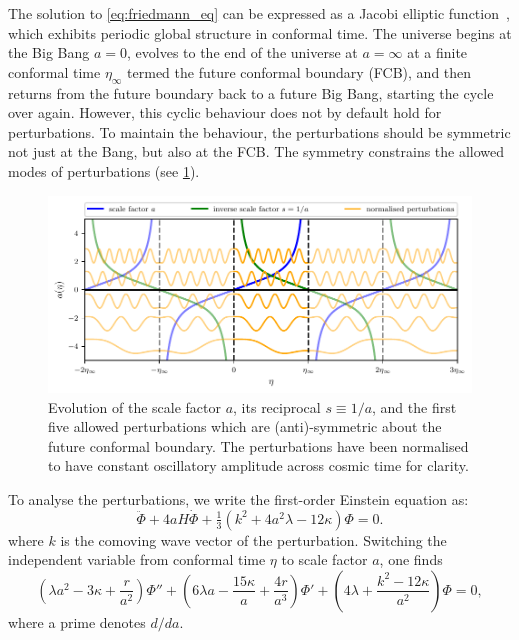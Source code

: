 \documentclass[%
 reprint,
 amsmath,amssymb,
 prl,
]{revtex4-2}
\begin{document}
The solution to \cref{eq:friedmann_eq} can be expressed as a Jacobi elliptic function~\cite{2021arXiv210906204B}, which exhibits periodic global structure in conformal time. The universe begins at the Big Bang \(a = 0\), evolves to the end of the universe at \(a=\infty\) at a finite conformal time \(\eta_{\infty}\) termed the future conformal boundary (FCB), and then returns from the future boundary back to a future Big Bang, starting the cycle over again. However, this cyclic behaviour does not by default hold for perturbations. To maintain the behaviour, the perturbations should be symmetric not just at the Bang, but also at the FCB. The symmetry constrains the allowed modes of perturbations (see \cref{fig:a_perturbations-eta}).
\begin{figure}[!ht]\centering
     \includegraphics{a_perturbations-eta.pdf}
     \caption{Evolution of the scale factor \(a\), its reciprocal \(s\equiv 1/a\), and the first five allowed perturbations which are (anti)-symmetric about the future conformal boundary. The perturbations have been normalised to have constant oscillatory amplitude across cosmic time for clarity.}
     \label{fig:a_perturbations-eta}
\end{figure}

To analyse the perturbations, we write the first-order Einstein equation as:
\begin{equation}\label{eq:perturbation_eq}
    \ddot{\Phi} + 4aH\dot{\Phi} + \tfrac{1}{3}(k^2 + 4a^2\lambda-12\kappa)\Phi = 0.
\end{equation}
where \(k\) is the comoving wave vector of the perturbation. Switching the independent variable from conformal time $\eta$ to scale factor $a$, one finds
\begin{equation}\label{eq:perturbation_a}
    (\lambda a^2 - 3\kappa + \frac{r}{a^2} )\Phi'' + (6\lambda a - \frac{15\kappa}{a} + \frac{4r}{a^3})\Phi' + (4\lambda+\frac{k^2-12\kappa}{a^2})\Phi = 0,
\end{equation}
where a prime denotes \(d/da\).
\end{document}
